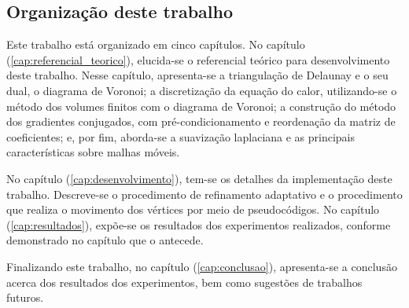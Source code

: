 \subsection{Organização deste trabalho}

Este trabalho está organizado em cinco capítulos. No capítulo (\ref{cap:referencial_teorico}), elucida-se o referencial teórico para desenvolvimento deste trabalho. Nesse capítulo, apresenta-se a triangulação de Delaunay e o seu dual, o diagrama de Voronoi; a discretização da equação do calor, utilizando-se o método dos volumes finitos com o diagrama de Voronoi; a construção do método dos gradientes conjugados, com pré-condicionamento e reordenação da matriz de coeficientes; e, por fim, aborda-se a suavização laplaciana e as principais características sobre malhas móveis.

No capítulo (\ref{cap:desenvolvimento}), tem-se os detalhes da implementação deste trabalho. Descreve-se o procedimento de refinamento adaptativo e o procedimento que realiza o movimento dos vértices por meio de pseudocódigos. No capítulo (\ref{cap:resultados}), expõe-se os resultados dos experimentos realizados, conforme demonstrado no capítulo que o antecede. 

Finalizando este trabalho, no capítulo (\ref{cap:conclusao}), apresenta-se a conclusão acerca dos resultados dos experimentos, bem como sugestões de trabalhos futuros.